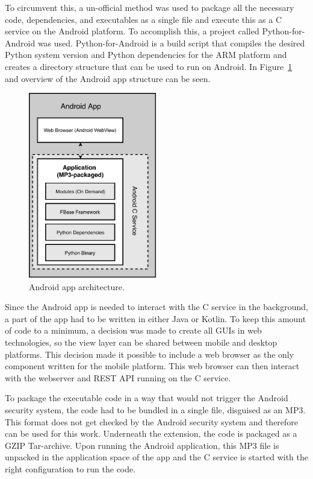 To circumvent this, a un-official method was used to package all the necessary code, dependencies, and executables as a single file and execute this as a C service on the Android platform. To accomplish this, a project called Python-for-Android was used. Python-for-Android is a build script that compiles the desired Python system version and Python dependencies for the ARM platform and creates a directory structure that can be used to run on Android. In Figure~\ref{fig:android-architecture} and overview of the Android app structure can be seen.

\begin{figure}[ht!]
	\centering
	\includegraphics[width=0.5\textwidth]{images/evaluation-android-app.pdf}
	\caption{\label{fig:android-architecture} Android app architecture.}
\end{figure}

Since the Android app is needed to interact with the C service in the background, a part of the app had to be written in either Java or Kotlin. To keep this amount of code to a minimum, a decision was made to create all GUIs in web technologies, so the view layer can be shared between mobile and desktop platforms. This decision made it possible to include a web browser as the only component written for the mobile platform. This web browser can then interact with the webserver and REST API running on the C service.

To package the executable code in a way that would not trigger the Android security system, the code had to be bundled in a single file, disguised as an MP3. This format does not get checked by the Android security system and therefore can be used for this work. Underneath the extension, the code is packaged as a GZIP Tar-archive. Upon running the Android application, this MP3 file is unpacked in the application space of the app and the C service is started with the right configuration to run the code.

